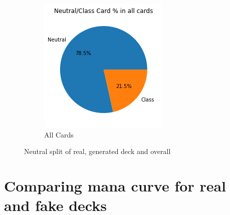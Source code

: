 \documentclass{report} %
\begin{document}
\begin{figure}[H]
\begin{subfigure}{.3\textwidth}
 \centering
 \includegraphics[width=.75\linewidth]{TestImages/NeutralSplitAllCards}
 \caption{All Cards}
\end{subfigure}
\caption{Neutral split of real, generated deck and overall}
\end{figure}
\section{Comparing mana curve for real and fake decks}
\end{document}
